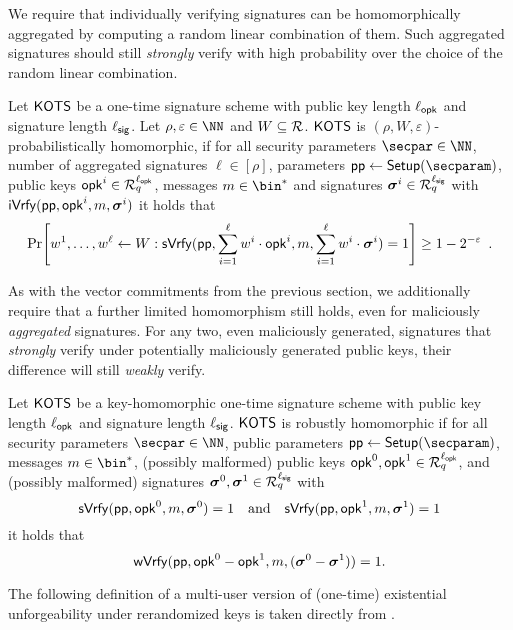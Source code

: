 We require that individually verifying signatures can be homomorphically aggregated by computing a random linear combination of them.
Such aggregated signatures should still \emph{strongly} verify with high probability over the choice of the random linear combination.

\begin{definition}
  Let $\mathsf{KOTS}$ be a one-time signature scheme with public key length ${\ell_{\mathsf{opk}}}$ and signature length ${\ell_{\mathsf{sig}}}$.
  Let $\rho,\varepsilon \in \NN$ and $W\subseteq \mathcal{R}$.
  $\mathsf{KOTS}$ is $(\rho,W,\varepsilon)$-probabilistically homomorphic, if 
  for all security parameters $\secpar\in\NN$, number of aggregated signatures $\ell\in[\rho]$, parameters $\params \gets \setup(\secparam)$, public keys $\mathsf{opk}^i \in \mathcal{R}_q^{\ell_{\mathsf{opk}}}$, messages $m\in\bin^*$ and signatures $\boldsymbol{\sigma}^i\in\mathcal{R}_q^{{\ell_{\mathsf{sig}}}}$ with $\mathsf{iVrfy}(\mathsf{pp},\mathsf{opk}^i,m,\boldsymbol{\sigma}^i)$ it holds that
  \[
    \Pr\mleft[
      w^1,\dots,w^\ell\gets W
      :
      \sverify(\params,\sum_{i=1}^{\ell}w^i\cdot\opk^i,m,\sum_{i=1}^{\ell}w^i\cdot\vec{\sigma}^i) = 1
    \mright]\geq 1-2^{-\varepsilon}\enspace.
  \]
\end{definition}

As with the vector commitments from the previous section, we additionally require that a further limited homomorphism still holds, even for maliciously \emph{aggregated} signatures.
For any two, even maliciously generated, signatures that \emph{strongly} verify under potentially maliciously generated public keys, their difference will still \emph{weakly} verify.

\begin{definition}
  \label{def:malhomhots}
  Let $\mathsf{KOTS}$ be a key-homomorphic one-time signature scheme with public key length ${\ell_{\mathsf{opk}}}$ and signature length ${\ell_{\mathsf{sig}}}$.
  $\mathsf{KOTS}$ is robustly homomorphic if for all security parameters $\secpar\in\NN$, public parameters $\params\gets\setup(\secparam)$, messages $m\in\bin^*$, (possibly malformed) public keys $\mathsf{opk}^0,\mathsf{opk}^1 \in \mathcal{R}_q^{\ell_{\mathsf{opk}}}$, and (possibly malformed) signatures $\boldsymbol{\sigma}^0,\boldsymbol{\sigma}^1\in\mathcal{R}_q^{\ell_{\mathsf{sig}}}$ with
  \[
    \mathsf{sVrfy}(\mathsf{pp},\mathsf{opk}^0, m,\boldsymbol{\sigma}^0)=1 \quad \text{and} \quad \mathsf{sVrfy}(\mathsf{pp},\mathsf{opk}^1, m,\boldsymbol{\sigma}^1)=1
  \]
  it holds that
  \[
    \mathsf{wVrfy}(\mathsf{pp},\mathsf{opk}^0-\mathsf{opk}^1, m,(\boldsymbol{\sigma}^0-\boldsymbol{\sigma}^1))=1.
  \]
\end{definition}

The following definition of a multi-user version of (one-time) existential unforgeability under rerandomized keys is taken directly from \cite{CCS:FleSimZha22}.

